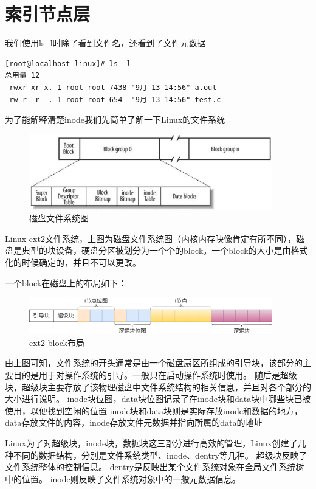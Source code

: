\section{索引节点层}

我们使用ls -l时除了看到文件名，还看到了文件元数据
\begin{lstlisting}[]
[root@localhost linux]# ls -l
总用量 12
-rwxr-xr-x. 1 root root 7438 "9月 13 14:56" a.out
-rw-r--r--. 1 root root 654  "9月 13 14:56" test.c
\end{lstlisting}

为了能解释清楚inode我们先简单了解一下Linux的文件系统
\begin{figure}[H]
    \centering
    \includegraphics{figures/07-04-磁盘.png}
    \caption{磁盘文件系统图}
\end{figure}

Linux ext2文件系统，上图为磁盘文件系统图（内核内存映像肯定有所不同），磁盘是典型的块设备，硬盘分区被划分为一个个的block。一个block的大小是由格式化的时候确定的，并且不可以更改。

一个block在磁盘上的布局如下：
\begin{figure}[H]
    \centering
    \includegraphics{figures/07-04-inode.png}
    \caption{ext2 block布局}
\end{figure}
由上图可知，文件系统的开头通常是由一个磁盘扇区所组成的引导块，该部分的主要目的是用于对操作系统的引导。一般只在启动操作系统时使用。
随后是超级块，超级块主要存放了该物理磁盘中文件系统结构的相关信息，并且对各个部分的大小进行说明。
inode块位图，data块位图记录了在inode块和data块中哪些块已被使用，以便找到空闲的位置
inode块和data块则是实际存放inode和数据的地方，data存放文件的内容，inode存放文件元数据并指向所属的data的地址

Linux为了对超级块，inode块，数据块这三部分进行高效的管理，Linux创建了几种不同的数据结构，分别是文件系统类型、inode、dentry等几种。
超级块反映了文件系统整体的控制信息。
dentry是反映出某个文件系统对象在全局文件系统树中的位置。
inode则反映了文件系统对象中的一般元数据信息。

